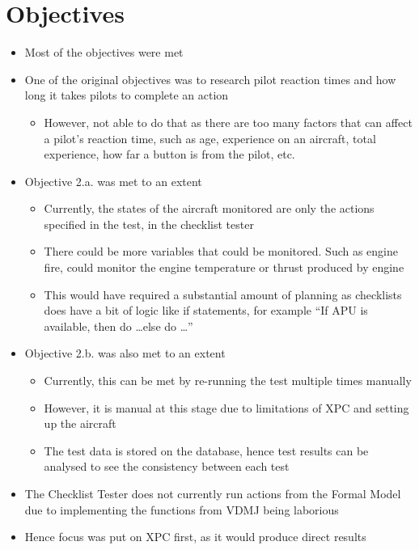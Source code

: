 \documentclass[../dissertation.tex]{subfiles}
\begin{document}
\section{Objectives}
\begin{itemize}
  \item Most of the objectives were met
  \item One of the original objectives was to research pilot
    reaction times and how long it takes pilots to complete an action
  \begin{itemize}
    \item However, not able to do that as there are too many factors
      that can affect a pilot's reaction time, such as age,
      experience on an aircraft, total experience, how far a button is
      from the pilot, etc.
  \end{itemize}
  \item Objective 2.a. was met to an extent
  \begin{itemize}
    \item Currently, the states of the aircraft monitored are only
      the actions specified in the test, in the checklist tester
    \item There could be more variables that could be monitored. Such
      as engine fire, could monitor the engine temperature or thrust
      produced by engine
    \item This would have required a substantial amount of planning
      as checklists does have a bit of logic like if statements,
      for example \enquote{If APU is available, then do \ldots else do \ldots}
  \end{itemize}
  \item Objective 2.b. was also met to an extent
  \begin{itemize}
    \item Currently, this can be met by re-running the test multiple
      times manually
    \item However, it is manual at this stage due to limitations of XPC
      and setting up the aircraft
    \item The test data is stored on the database, hence test results
      can be analysed to see the consistency between each test
  \end{itemize}
  \item The Checklist Tester does not currently run actions from the
    Formal Model due to implementing the functions from VDMJ being
    laborious
  \item Hence focus was put on XPC first, as it would produce direct results
\end{itemize}
\end{document}

